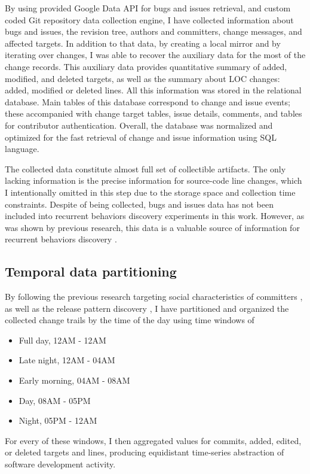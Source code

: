 \documentclass[conference]{worldcomp}
\begin{document}
By using provided Google Data API for bugs and issues retrieval, and custom coded
Git repository data collection engine, I have collected information about bugs and issues,
the revision tree, authors and committers, change messages, and affected targets. 
In addition to that data, by creating a local mirror and by iterating over changes, I was able 
to recover the auxiliary data for the most of the change records. This auxiliary data provides quantitative
summary of added, modified, and deleted targets, as well as the summary about LOC changes: 
added, modified or deleted lines. All this information 
was stored in the relational database. Main tables of this database correspond to change 
and issue events; these accompanied with change target tables, issue details, comments, and 
tables for contributor authentication. Overall, the database was normalized and optimized 
for the fast retrieval of change and issue information using SQL language.

The collected data constitute almost full set of collectible artifacts. 
The only lacking information is the precise information for source-code line changes, which I 
intentionally omitted in this step due to the storage space and collection time constraints. 
Despite of being collected, bugs and issues data has not been included into recurrent 
behaviors discovery experiments in this work. However, as was shown by previous research, 
this data is a valuable source of information for recurrent behaviors discovery \cite{citeulike:10392277}.

\subsection{Temporal data partitioning} \label{partitioning}
By following the previous research targeting social characteristics of committers \cite{citeulike:10392277}, 
as well as the release pattern discovery \cite{citeulike:10377366}, I have partitioned and organized 
the collected change trails by the time of the day using time windows of
\begin{itemize}
    \item Full day, 12AM - 12AM
    \item Late night, 12AM - 04AM  
    \item Early morning, 04AM - 08AM  
    \item Day, 08AM - 05PM  
    \item Night, 05PM - 12AM
\end{itemize}
For every of these windows, I then aggregated values for commits, added, edited, or deleted 
targets and lines, producing equidistant time-series abstraction of software development activity.
\end{document}
